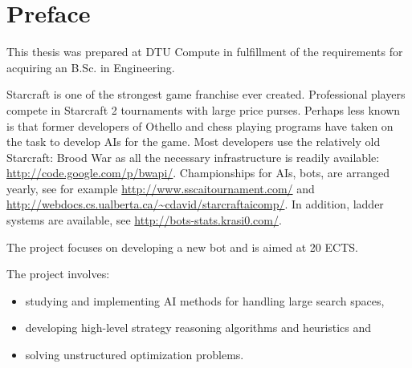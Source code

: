 \chapter{Preface}
This thesis was prepared at DTU Compute in fulfillment of the requirements for acquiring an B.Sc. in Engineering.

Starcraft is one of the strongest game franchise ever created. Professional players compete in Starcraft 2 tournaments with large price purses. Perhaps less known is that former developers of Othello and chess playing programs have taken on the task to develop AIs for the game. Most developers use the relatively old Starcraft: Brood War as all the necessary infrastructure is readily available: \url{http://code.google.com/p/bwapi/}. Championships for AIs, bots, are arranged yearly, see for example \url{http://www.sscaitournament.com/} and \url{http://webdocs.cs.ualberta.ca/~cdavid/starcraftaicomp/}. In addition, ladder systems are available, see \url{http://bots-stats.krasi0.com/}. \cite{SSCAIT}

The project focuses on developing a new bot and is aimed at 20 ECTS.

The project involves:
\begin{itemize}
	\item studying and implementing AI methods for handling large search spaces,
	\item developing high-level strategy reasoning algorithms and heuristics and
	\item solving unstructured optimization problems.
\end{itemize}